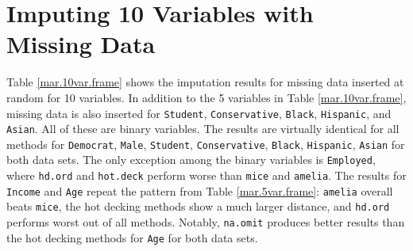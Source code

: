 \documentclass[12pt,econ]{sources/authesis}
\begin{document}
\hypertarget{app-framing-10var}{%
\section{Imputing 10 Variables with Missing Data}\label{app-framing-10var}}

Table \ref{mar.10var.frame} shows the imputation results for missing data inserted at random for 10 variables. In addition to the 5 variables in Table \ref{mar.10var.frame}, missing data is also inserted for \texttt{Student}, \texttt{Conservative}, \texttt{Black}, \texttt{Hispanic}, and \texttt{Asian}. All of these are binary variables. The results are virtually identical for all methods for \texttt{Democrat}, \texttt{Male}, \texttt{Student}, \texttt{Conservative}, \texttt{Black}, \texttt{Hispanic}, \texttt{Asian} for both data sets. The only exception among the binary variables is \texttt{Employed}, where \texttt{hd.ord} and \texttt{hot.deck} perform worse than \texttt{mice} and \texttt{amelia}. The results for \texttt{Income} and \texttt{Age} repeat the pattern from Table \ref{mar.5var.frame}: \texttt{amelia} overall beats \texttt{mice}, the hot decking methods show a much larger distance, and \texttt{hd.ord} performs worst out of all methods. Notably, \texttt{na.omit} produces better results than the hot decking methods for \texttt{Age} for both data sets.

\ssp
\end{document}
